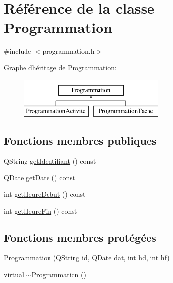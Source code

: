 \hypertarget{class_programmation}{}\section{Référence de la classe Programmation}
\label{class_programmation}


{\ttfamily \#include $<$programmation.\+h$>$}

Graphe d\textquotesingle{}héritage de Programmation\+:\begin{figure}[H]
\begin{center}
\leavevmode
\includegraphics[height=2.000000cm]{class_programmation}
\end{center}
\end{figure}
\subsection*{Fonctions membres publiques}
\begin{DoxyCompactItemize}
\item 
Q\+String \hyperlink{class_programmation_a37380f79c4235bfedcbab7c2b9c5de5c}{get\+Identifiant} () const 
\item 
Q\+Date \hyperlink{class_programmation_abd1632dfa907a6bf2a84bfdbc3bef38f}{get\+Date} () const 
\item 
int \hyperlink{class_programmation_a927a5f9c0c752d33d12eb100b9315055}{get\+Heure\+Debut} () const 
\item 
int \hyperlink{class_programmation_a8ebc1580f9e4a3a3317d4a5535e28d8b}{get\+Heure\+Fin} () const 
\end{DoxyCompactItemize}
\subsection*{Fonctions membres protégées}
\begin{DoxyCompactItemize}
\item 
\hyperlink{class_programmation_a73e7d51291b37140ffb7647bfa0d5ff3}{Programmation} (Q\+String id, Q\+Date dat, int hd, int hf)
\item 
virtual \hyperlink{class_programmation_aa477667deb545f10a3f5d32d7a3df590}{$\sim$\+Programmation} ()
\end{DoxyCompactItemize}
